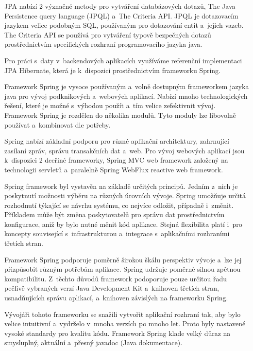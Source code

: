 \documentclass[12pt]{article}
\begin{document}
{%
JPA nabízí 2 význačné metody pro vytváření databázových dotazů, 
The Java Persistence query language (JPQL) a~The Criteria API.
JPQL je dotazovacím jazykem velice podobným SQL, používaným pro dotazování
entit a~jejich vazeb.
The Criteria API se používá pro vytváření typově bezpečných dotazů
prostřednictvím specifických rozhraní programovacího jazyka java.


Pro práci s~daty v~backendových aplikacích využíváme referenční implementaci 
JPA Hibernate, která je k~dispozici prostřednictvím frameworku Spring.


Framework Spring je vysoce používaným a~volně dostupným frameworkem
jazyka java pro vývoj podknikových a~webových aplikací.
Nabízí mnoho technologických řešení, které je možné s~výhodou
použít a~tím velice zefektivnit vývoj.
Framework Spring je rozdělen do několika modulů.
Tyto moduly lze libovolně používat a~kombinovat dle potřeby.

Spring nabízí základní podporu pro různé aplikační architektury,
zahrnující zasílaní zpráv, správu transakčních dat a~web.
Pro vývoj webových aplikací jsou k~dispozici 2 dceřiné frameworky,
Spring MVC web framework založený na technologii servletů 
a~paralelně Spring WebFlux reactive web framework.

Spring framework byl vystavěn na základě určitých principů.
Jedním z~nich je poskytnutí možnosti výběru na různých úrovních vývoje.
Spring umožňuje určitá rozhodnutí týkající se návrhu systému, 
co nejvíce odložit, případně i~změnit.
Příkladem může být změna poskytovatelů 
pro správu dat prostřednictvím konfigurace,
aniž by bylo nutné měnit kód aplikace.
Stejná flexibilita platí i~pro koncepty související s~infrastrukturou 
a~integrace s~aplikačními rozhraními třetích stran.

Framework Spring podporuje poměrně širokou škálu perspektiv vývoje
a~lze jej přizpůsobit různým potřebám aplikace.
Spring udržuje poměrně silnou zpětnou kompatibilitu. 
Z~těchto důvodů framework podoporuje pouze určitou řadu
pečlivě vybraných verzí Java Development Kit
a~knihoven třetích stran, usnadňujících správu aplikací,
a~knihoven závislých na frameworku Spring.

Vývojáři tohoto frameworku se snažili vytvořit aplikační rozhraní tak,
aby bylo velice intuitivní a~vydrželo v~mnoha verzích po mnoho let.
Proto byly nastavené vysoké standardy pro kvalitu kódu.
Framework Spring klade velký důraz na smysluplný, aktuální a~přesný javadoc
(Java dokumentace).

}
\end{document}
